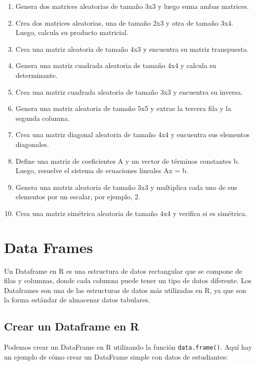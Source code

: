 \documentclass[
]{book}
\begin{document}
\begin{enumerate}
\def\labelenumi{\arabic{enumi}.}
\item
  Genera dos matrices aleatorias de tamaño 3x3 y luego suma ambas matrices.
\item
  Crea dos matrices aleatorias, una de tamaño 2x3 y otra de tamaño 3x4. Luego, calcula su producto matricial.
\item
  Crea una matriz aleatoria de tamaño 4x3 y encuentra su matriz transpuesta.
\item
  Genera una matriz cuadrada aleatoria de tamaño 4x4 y calcula su determinante.
\item
  Crea una matriz cuadrada aleatoria de tamaño 3x3 y encuentra su inversa.
\item
  Genera una matriz aleatoria de tamaño 5x5 y extrae la tercera fila y la segunda columna.
\item
  Crea una matriz diagonal aleatoria de tamaño 4x4 y encuentra sus elementos diagonales.
\item
  Define una matriz de coeficientes A y un vector de términos constantes b. Luego, resuelve el sistema de ecuaciones lineales Ax = b.
\item
  Genera una matriz aleatoria de tamaño 3x3 y multiplica cada uno de sus elementos por un escalar, por ejemplo, 2.
\item
  Crea una matriz simétrica aleatoria de tamaño 4x4 y verifica si es simétrica.
\end{enumerate}

\hypertarget{data-frames}{%
\chapter{Data Frames}\label{data-frames}}

Un Dataframe en R es una estructura de datos rectangular que se compone de filas y columnas, donde cada columna puede tener un tipo de datos diferente. Los Dataframes son una de las estructuras de datos más utilizadas en R, ya que son la forma estándar de almacenar datos tabulares.

\hypertarget{crear-un-dataframe-en-r}{%
\section{Crear un Dataframe en R}\label{crear-un-dataframe-en-r}}

Podemos crear un DataFrame en R utilizando la función \texttt{data.frame()}. Aquí hay un ejemplo de cómo crear un DataFrame simple con datos de estudiantes:
\end{document}
